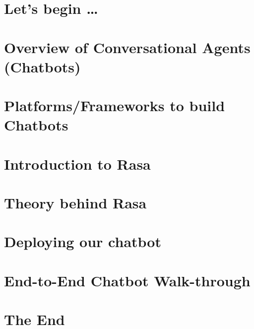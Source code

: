 \section[Start]{Let's begin \ldots}


\section[Overview]{Overview of Conversational Agents (Chatbots)}


\section[Platforms]{Platforms/Frameworks to build Chatbots}



\section[Intro]{Introduction to Rasa}



\section[Theory]{Theory behind Rasa}



% 

% 

\section[Deploy]{Deploying our chatbot}


\section[Walk-through]{End-to-End Chatbot Walk-through}



\section[End]{The End}

